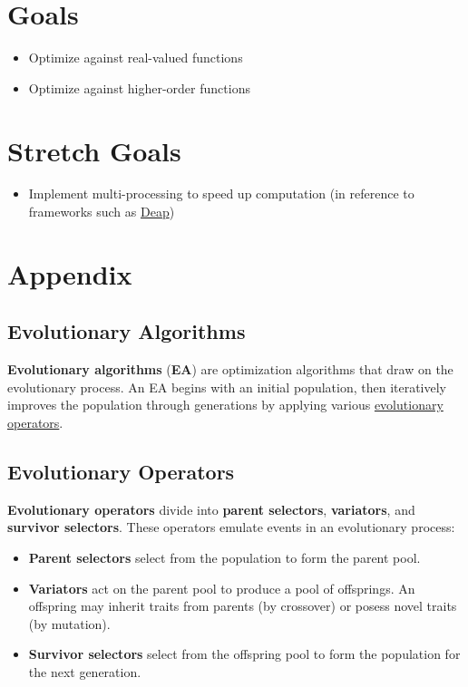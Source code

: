 \documentclass{article}
\begin{document}
\section{Goals}
\begin{itemize}
    \item Optimize against real-valued functions
    \item Optimize against higher-order functions
\end{itemize}

\section{Stretch Goals}

\begin{itemize}
    \item Implement multi-processing to speed up computation (in reference to frameworks such as \href{https://deap.readthedocs.io/en/master/}{Deap})
\end{itemize}
\section{Appendix}

\subsection{Evolutionary Algorithms}
\label{sec:evalg}
\textbf{Evolutionary algorithms} (\textbf{EA}) are optimization algorithms that draw on the evolutionary process. An EA begins with an initial population, then iteratively improves the population through generations by applying various \hyperref[sec:evop]{evolutionary operators}.

\subsection{Evolutionary Operators}
\label{sec:evop}
\textbf{Evolutionary operators} divide into \textbf{parent selectors}, \textbf{variators}, and \textbf{survivor selectors}. These operators emulate events in an evolutionary process:

\begin{itemize}
    \item \textbf{Parent selectors} select from the population to form the parent pool.
    \item \textbf{Variators} act on the parent pool to produce a pool of offsprings. An offspring may inherit traits from parents (by crossover) or posess novel traits (by mutation).
    \item \textbf{Survivor selectors} select from the offspring pool to form the population for the next generation.
\end{itemize}
\end{document}
